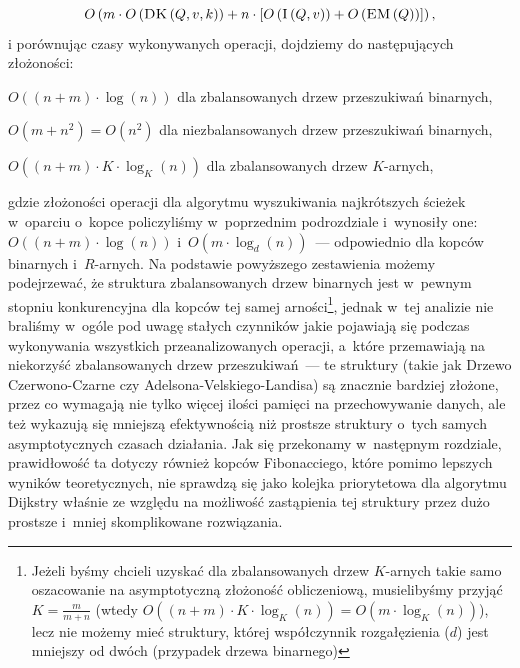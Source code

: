 \begin{equation}
	O \left( m \cdot O \left( \textrm{\textsc{DK}} \left( Q, v, k \right) \right) + n \cdot \left[ O \left( \textrm{\textsc{I}} \left( Q, v \right) \right) + O \left( \textrm{\textsc{EM}} \left( Q \right) \right) \right] \right)\textrm{,}
\end{equation}\label{eq:dijkstraComplexityShort}
i porównując czasy wykonywanych operacji, dojdziemy do następujących złożoności:

\begin{myitemize}
	\item $O \left( \left( n + m \right) \cdot \log \left( n \right) \right)$ dla zbalansowanych drzew przeszukiwań binarnych,
	\item $O \left( m + n^{2} \right) = O \left( n^{2} \right)$ dla niezbalansowanych drzew przeszukiwań binarnych,
	\item $O \left( \left( n + m \right) \cdot K \cdot \log_{K} \left( n \right) \right)$ dla zbalansowanych drzew $K$-arnych,
\end{myitemize}
gdzie złożoności operacji dla algorytmu wyszukiwania najkrótszych ścieżek w~oparciu o~kopce policzyliśmy w~poprzednim podrozdziale i~wynosiły one: $O \left( \left( n + m \right) \cdot \log \left( n \right) \right)$ i~$O \left( m \cdot \log_{d} \left( n \right) \right)$~--- odpowiednio dla kopców binarnych i~$R$-arnych.
Na podstawie powyższego zestawienia możemy podejrzewać, że struktura zbalansowanych drzew binarnych jest w~pewnym stopniu konkurencyjna dla kopców tej samej arności\footnote{
	Jeżeli byśmy chcieli uzyskać dla zbalansowanych drzew $K$-arnych takie samo oszacowanie na asymptotyczną złożoność obliczeniową, musielibyśmy przyjąć $K = \frac{m}{m+n}$ (wtedy $O \left( \left( n + m \right) \cdot K \cdot \log_{K} \left( n \right) \right) = O \left( m \cdot \log_{K} \left( n \right) \right)$), lecz nie możemy mieć struktury, której współczynnik rozgałęzienia ($d$) jest mniejszy od dwóch (przypadek drzewa binarnego)
}, jednak w~tej analizie nie braliśmy w~ogóle pod uwagę stałych czynników jakie pojawiają się podczas wykonywania wszystkich przeanalizowanych operacji, a~które przemawiają na niekorzyść zbalansowanych drzew przeszukiwań~--- te struktury (takie jak Drzewo Czerwono-Czarne czy Adelsona-Velskiego-Landisa) są znacznie bardziej złożone, przez co wymagają nie tylko więcej ilości pamięci na przechowywanie danych, ale też wykazują się mniejszą efektywnością niż prostsze struktury o~tych samych asymptotycznych czasach działania.
Jak się przekonamy w~następnym rozdziale, prawidłowość ta dotyczy również kopców Fibonacciego, które pomimo lepszych wyników teoretycznych, nie sprawdzą się jako kolejka priorytetowa dla algorytmu Dijkstry właśnie ze względu na możliwość zastąpienia tej struktury przez dużo prostsze i~mniej skomplikowane rozwiązania.



